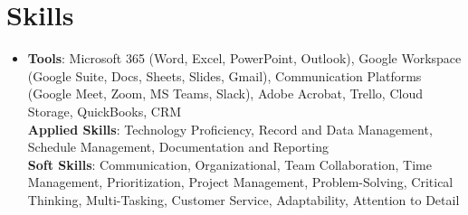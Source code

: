 \documentclass[letterpaper,11pt]{article}
\begin{document}
\section{Skills}
\begin{itemize}[leftmargin=0.15in, label={}]
\item{
\textbf{Tools}{: Microsoft 365 (Word, Excel, PowerPoint, Outlook), Google Workspace (Google Suite, Docs, Sheets, Slides, Gmail), Communication Platforms (Google Meet, Zoom, MS Teams, Slack), Adobe Acrobat, Trello, Cloud Storage, QuickBooks, CRM} \\
\textbf{Applied Skills}{: Technology Proficiency, Record and Data Management, Schedule Management, Documentation and Reporting} \\
\textbf{Soft Skills}{: Communication, Organizational, Team Collaboration, Time Management, Prioritization, Project Management, Problem-Solving, Critical Thinking, Multi-Tasking, Customer Service, Adaptability, Attention to Detail}
} \\
\end{itemize}


\end{document}
